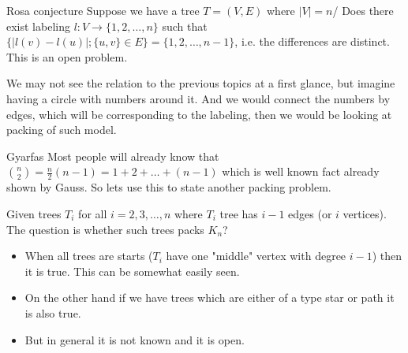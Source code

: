 \begin{topic}{Rosa conjecture}
	Suppose we have a tree $T = (V,E)$ where $|V| = n$/ Does there exist labeling $l : V \to \{1,2, \dots, n\}$ such that $\{|l(v) - l(u)|; \{u,v\} \in E\} = \{1,2, \dots, n-1\}$, i.e. the differences are distinct. This is an \OPEN open problem.
	
	We may not see the relation to the previous topics at a first glance, but imagine having a circle with numbers around it. And we would connect the numbers by edges, which will be corresponding to the labeling, then we would be looking at packing of such model.
\end{topic}

\begin{topic}{Gyarfas}
	Most people will already know that $\binom{n}{2} = \frac{n}{2} (n-1) = 1 + 2 + \dots + (n-1)$ which is well known fact already shown by Gauss. So lets use this to state another packing problem.
	
	Given trees $T_i$ for all $i = 2,3, \dots, n$ where $T_i$ tree has $i-1$ edges (or $i$ vertices). The question is whether such trees packs $K_n$?
	
	\begin{itemize}
		\item When all trees are starts ($T_i$ have one "middle" vertex with degree $i-1$) then it is true. This can be somewhat easily seen.
		\item On the other hand if we have trees which are either of a type star or path it is also true.
		\item But in general it is not known and it is \OPEN open.
	\end{itemize}
\end{topic}

